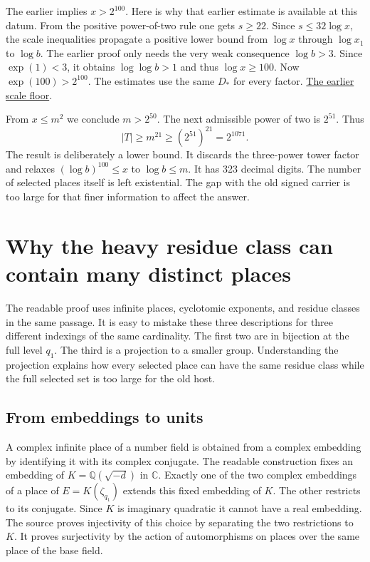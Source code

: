\documentclass[12pt,letterpaper]{article}
\newcommand{\id}[1]{\ifmmode\text{\small\nolinkurl{#1}}\else{\small\nolinkurl{#1}}\fi}
\newcommand{\prior}[2]{\href{https://github.com/nousentllc/riemann-hypothesis/blob/90e46dd4be3b077bfed33fa64280eb9f306c9d87/research/uriel/experiments/fixed-datum-host-expanded/#1}{#2}}
\begin{document}
The earlier \id{scale_floor} implies $x>2^{100}$. Here is why that earlier estimate is available at this datum. From the positive power-of-two rule one gets $s\ge22$. Since $s\le32\log x$, the scale inequalities propagate a positive lower bound from $\log x$ through $\log x_1$ to $\log b$. The earlier proof only needs the very weak consequence $\log b>3$. Since $\exp(1)<3$, it obtains $\log\log b>1$ and thus $\log x\ge100$. Now $\exp(100)>2^{100}$. The estimates use the same $D_*$ for every factor. \prior{ScaleControl.lean}{The earlier scale floor}.

From $x\le m^2$ we conclude $m>2^{50}$. The next admissible power of two is $2^{51}$. Thus
\[
             |T|\ge m^{21}\ge (2^{51})^{21}=2^{1071}.
\]
The result is deliberately a lower bound. It discards the three-power tower factor and relaxes $(\log b)^{100}\le x$ to $\log b\le m$. It has 323 decimal digits. The number of selected places itself is left existential. The gap with the old signed carrier is too large for that finer information to affect the answer.


\section{Why the heavy residue class can contain many distinct places}
The readable proof uses infinite places, cyclotomic exponents, and residue classes in the same passage. It is easy to mistake these three descriptions for three different indexings of the same cardinality. The first two are in bijection at the full level $q_1$. The third is a projection to a smaller group. Understanding the projection explains how every selected place can have the same residue class while the full selected set is too large for the old host.

\subsection{From embeddings to units}
A complex infinite place of a number field is obtained from a complex embedding by identifying it with its complex conjugate. The readable construction fixes an embedding of $K=\mathbb Q(\sqrt{-d})$ in $\mathbb C$. Exactly one of the two complex embeddings of a place of $E=K(\zeta_{q_1})$ extends this fixed embedding of $K$. The other restricts to its conjugate. Since $K$ is imaginary quadratic it cannot have a real embedding. The source proves injectivity of this choice by separating the two restrictions to $K$. It proves surjectivity by the action of automorphisms on places over the same place of the base field.
\end{document}
